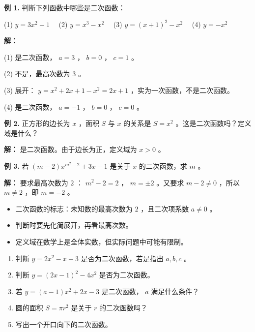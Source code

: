 \begin{workedexamples}


\textbf{例 1.} 判断下列函数中哪些是二次函数：

(1) $y = 3x^2 + 1$ 　(2) $y = x^3 - x^2$ 　(3) $y = (x+1)^2 - x^2$ 　(4) $y = -x^2$

\textbf{解：}

(1) 是二次函数， $a = 3$ ， $b = 0$ ， $c = 1$ 。

(2) 不是，最高次数为 $3$ 。

(3) 展开： $y = x^2 + 2x + 1 - x^2 = 2x + 1$ ，实为一次函数，不是二次函数。

(4) 是二次函数， $a = -1$ ， $b = 0$ ， $c = 0$ 。

\textbf{例 2.} 正方形的边长为 $x$ ，面积 $S$ 与 $x$ 的关系是 $S = x^2$ 。这是二次函数吗？定义域是什么？

\textbf{解：} 是二次函数。由于边长为正，定义域为 $x > 0$ 。

\textbf{例 3.} 若 $(m - 2)x^{m^2 - 2} + 3x - 1$ 是关于 $x$ 的二次函数，求 $m$ 。

\textbf{解：} 要求最高次数为 $2$ ： $m^2 - 2 = 2$ ， $m = \pm 2$ 。又要求 $m - 2 \neq 0$ ，所以 $m \neq 2$ ，即 $m = -2$ 。

\end{workedexamples}

\begin{keytakeaway}


\begin{itemize}
  \item 二次函数的标志：未知数的最高次数为 $2$ ，且二次项系数 $a \neq 0$ 。
  \item 判断时要先化简展开，再看最高次数。
  \item 定义域在数学上是全体实数，但实际问题中可能有限制。
\end{itemize}


\end{keytakeaway}

\begin{practice}


\begin{enumerate}
  \item 判断 $y = 2x^2 - x + 3$ 是否为二次函数，若是指出 $a, b, c$ 。
  \item 判断 $y = (2x-1)^2 - 4x^2$ 是否为二次函数。
  \item 若 $y = (a-1)x^2 + 2x - 3$ 是二次函数， $a$ 满足什么条件？
  \item 圆的面积 $S = \pi r^2$ 是关于 $r$ 的二次函数吗？
  \item 写出一个开口向下的二次函数。
\end{enumerate}


\end{practice}

